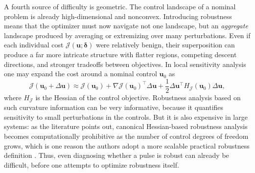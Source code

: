 A fourth source of difficulty is geometric. The control landscape of a nominal problem is already high-dimensional and nonconvex. Introducing robustness means that the optimizer must now navigate not one landscape, but an \emph{aggregate} landscape produced by averaging or extremizing over many perturbations. Even if each individual cost $\mathcal{J}(\bm{u};\bm{\delta})$ were relatively benign, their superposition can produce a far more intricate structure with flatter regions, competing descent directions, and stronger tradeoffs between objectives. In local sensitivity analysis one may expand the cost around a nominal control $\bm{u}_{0}$ as
\begin{equation}
\mathcal{J}(\bm{u}_{0}+\Delta \bm{u})
\approx
\mathcal{J}(\bm{u}_{0})
+
\nabla \mathcal{J}(\bm{u}_{0})^{\top}\Delta \bm{u}
+
\frac{1}{2}\Delta \bm{u}^{\top}
H_{\mathcal{J}}(\bm{u}_{0})
\Delta \bm{u},
\label{eq:hessian_expansion_robustness}
\end{equation}
where $H_{\mathcal{J}}$ is the Hessian of the control objective. Robustness analysis based on such curvature information can be very informative, because it quantifies sensitivity to small perturbations in the controls. But it is also expensive in large systems: as the literature points out, canonical Hessian-based robustness analysis becomes computationally prohibitive as the number of control degrees of freedom grows, which is one reason the authors adopt a more scalable practical robustness definition \cite{Niu2019}. Thus, even diagnosing whether a pulse is robust can already be difficult, before one attempts to optimize robustness itself.

